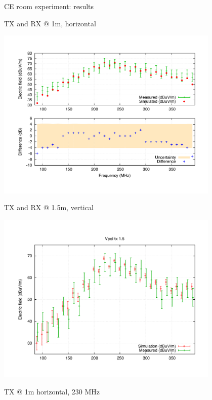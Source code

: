 \documentclass{beamer}
\begin{document}
\begin{frame}{CE room experiment: results}
    \footnotesize
    \begin{minipage}{0.48\textwidth}
        TX and RX @ 1m, horizontal

        \includegraphics[width=0.8\textwidth]{img/comparison100h.pdf}

        \vspace{4mm}
        TX and RX @ 1.5m, vertical

        \includegraphics[width=0.8\textwidth]{img/comparison150v.pdf}

    \end{minipage}
    \hfill
    \begin{minipage}{0.48\textwidth}
        TX @ 1m horizontal, 230 MHz


\end{minipage}
\end{frame}
\end{document}
